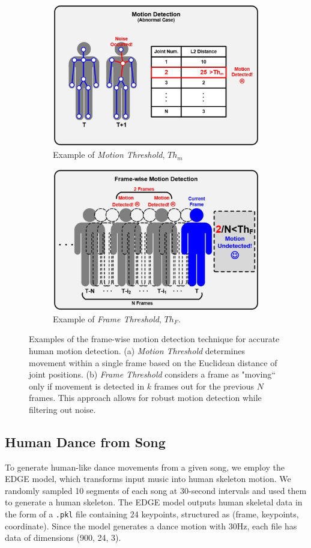 \documentclass[letterpaper, 10 pt, conference]{ieeeconf}  %
\begin{document}
\begin{figure}[h]
    \centering
    \begin{subfigure}[b]{\linewidth}
        \centering
        \includegraphics[width=0.7\linewidth]{figures/figure_motion_threshold.jpg}
        \caption{Example of \textit{Motion Threshold}, $Th_{m}$}
    \end{subfigure}
    \hfill
    \begin{subfigure}[b]{\linewidth}
        \centering
        \includegraphics[width=0.7\linewidth]{figures/figure_frame_threshold.jpg}
        \caption{Example of \textit{Frame Threshold}, $Th_{F}$.}
    \end{subfigure}
    \caption{Examples of the frame-wise motion detection technique for accurate human motion detection. (a) \textit{Motion Threshold} determines movement within a single frame based on the Euclidean distance of joint positions. (b) \textit{Frame Threshold} considers a frame as "moving“ only if movement is detected in $k$ frames out for the previous $N$ frames. This approach allows for robust motion detection while filtering out noise.}\label{fig:human_robot_keypoints}
\end{figure}

\subsection{Human Dance from Song}
To generate human-like dance movements from a given song, we employ the EDGE \cite{tseng2023edge} model, which transforms input music into human skeleton motion. We randomly sampled 10 segments of each song at 30-second intervals and used them to generate a human skeleton. The EDGE model outputs human skeletal data in the form of a \texttt{.pkl} file containing 24 keypoints, structured as (frame, keypoints, coordinate). Since the model generates a dance motion with 30Hz, each file has data of dimensions (900, 24, 3).
\end{document}
